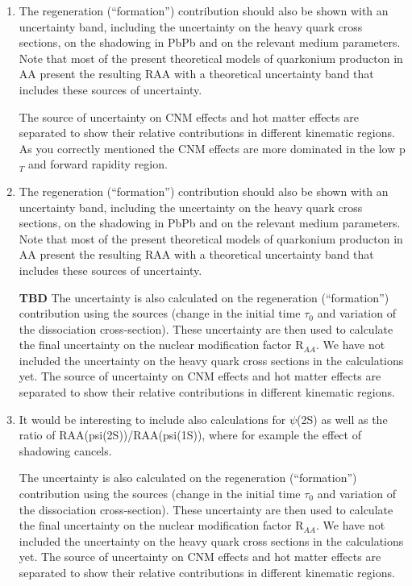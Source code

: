 \documentclass[a4paper,11pt]{article}
\begin{document}
\begin{enumerate}
\item The regeneration (“formation”) contribution should also be shown with an uncertainty band, including the uncertainty on the heavy quark cross sections,
  on the shadowing in PbPb and on the relevant medium parameters. Note that most of the present theoretical models of quarkonium producton in AA
  present the resulting RAA with a theoretical uncertainty band that includes these sources of uncertainty.

  {\color{blue}
    The source of uncertainty on CNM effects and hot matter effects are separated to show their relative contributions in different kinematic regions.
    As you correctly mentioned the CNM effects are more dominated in the low p$_{T}$ and forward rapidity region.  
  }

  
\item  The regeneration (“formation”) contribution should also be shown with an uncertainty band, including the uncertainty on the heavy quark
  cross sections, on the shadowing in PbPb and on the relevant medium parameters. Note that most of the present theoretical models of quarkonium
  producton in AA present the resulting RAA with a theoretical uncertainty band that includes these sources of uncertainty.


  {\color{red} \textbf{TBD}
    The uncertainty is also calculated on the regeneration (“formation”) contribution using the sources (change in the initial time $\tau_0$ and
    variation of the dissociation cross-section). These uncertainty are then used to calculate the final uncertainty on the nuclear modification
    factor R$_{AA}$. We have not included the uncertainty on the heavy quark cross sections in the calculations yet. The source of uncertainty on
    CNM effects and hot matter effects are separated to show their relative contributions in different kinematic regions.  
}


\item It would be interesting to include also calculations for $\psi$(2S) as well as the ratio of RAA(psi(2S))/RAA(psi(1S)),
  where for example the effect of shadowing cancels.


  {\color{blue}
    The uncertainty is also calculated on the regeneration (“formation”) contribution using the sources (change in the initial time $\tau_0$ and
    variation of the dissociation cross-section). These uncertainty are then used to calculate the final uncertainty on the nuclear modification
    factor R$_{AA}$. We have not included the uncertainty on the heavy quark cross sections in the calculations yet. The source of uncertainty on
    CNM effects and hot matter effects are separated to show their relative contributions in different kinematic regions.  
}  



\end{enumerate}
\end{document}
